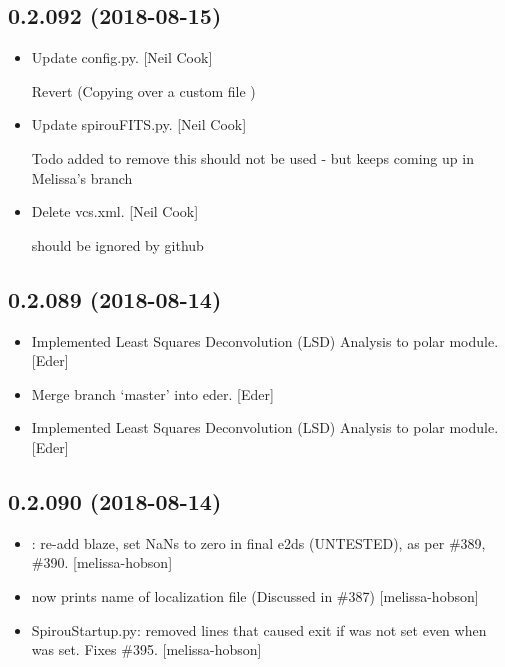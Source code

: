 \documentclass[a4paper,10pt,english]{report}
\begin{document}
\subsection{0.2.092 (2018-08-15)}
\label{\detokenize{misc/changelog:id369}}\begin{itemize}
\item {} 
Update config.py. {[}Neil Cook{]}

Revert  (Copying over a custom  file )

\item {} 
Update spirouFITS.py. {[}Neil Cook{]}

Todo added to remove  this should not be used - but keeps coming up in Melissa’s branch

\item {} 
Delete vcs.xml. {[}Neil Cook{]}

should be ignored by github

\end{itemize}


\subsection{0.2.089 (2018-08-14)}
\label{\detokenize{misc/changelog:id370}}\begin{itemize}
\item {} 
Implemented Least Squares Deconvolution (LSD) Analysis to polar
module. {[}Eder{]}

\item {} 
Merge branch ‘master’ into eder. {[}Eder{]}

\item {} 
Implemented Least Squares Deconvolution (LSD) Analysis to polar
module. {[}Eder{]}

\end{itemize}


\subsection{0.2.090 (2018-08-14)}
\label{\detokenize{misc/changelog:id371}}\begin{itemize}
\item {} 
: re-add blaze, set NaNs to zero in final e2ds
(UNTESTED), as per \#389, \#390. {[}melissa-hobson{]}

\item {} 
 now prints name of localization file (Discussed in
\#387) {[}melissa-hobson{]}

\item {} 
SpirouStartup.py: removed lines that caused exit if  was not
set even when  was set. Fixes \#395. {[}melissa-hobson{]}

\end{itemize}
\end{document}
